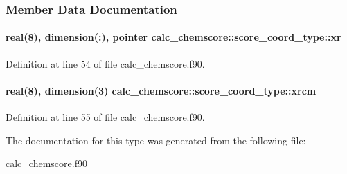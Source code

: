 \subsubsection{Member Data Documentation}
\hypertarget{structcalc__chemscore_1_1score__coord__type_abba8f44e4bea4ac623e9c1ab271a6ded}{
\paragraph[{xr}]{\setlength{\rightskip}{0pt plus 5cm}real(8), dimension(\-:), pointer calc\-\_\-chemscore\-::score\-\_\-coord\-\_\-type\-::xr}}\label{structcalc__chemscore_1_1score__coord__type_abba8f44e4bea4ac623e9c1ab271a6ded}


Definition at line 54 of file calc\-\_\-chemscore.\-f90.

\hypertarget{structcalc__chemscore_1_1score__coord__type_ae917506bef9aa4646094824d5c5a606b}{
\paragraph[{xrcm}]{\setlength{\rightskip}{0pt plus 5cm}real(8), dimension(3) calc\-\_\-chemscore\-::score\-\_\-coord\-\_\-type\-::xrcm}}\label{structcalc__chemscore_1_1score__coord__type_ae917506bef9aa4646094824d5c5a606b}


Definition at line 55 of file calc\-\_\-chemscore.\-f90.



The documentation for this type was generated from the following file\-:\begin{DoxyCompactItemize}
\item 
\hyperlink{calc__chemscore_8f90}{calc\-\_\-chemscore.\-f90}\end{DoxyCompactItemize}
